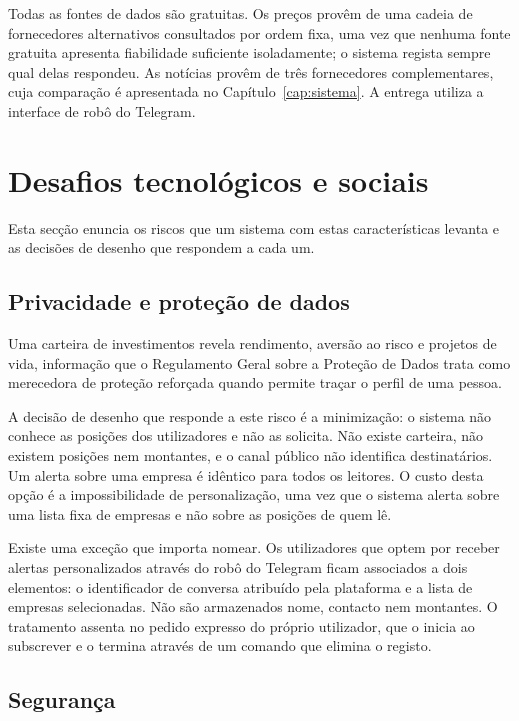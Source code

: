 Todas as fontes de dados são gratuitas. Os preços provêm de uma cadeia de fornecedores alternativos
consultados por ordem fixa, uma vez que nenhuma fonte gratuita apresenta fiabilidade suficiente
isoladamente; o sistema regista sempre qual delas respondeu. As notícias provêm de três fornecedores
complementares, cuja comparação é apresentada no Capítulo~\ref{cap:sistema}. A entrega utiliza a
interface de robô do Telegram.

\section{Desafios tecnológicos e sociais}
\label{sec:met_desafios}

Esta secção enuncia os riscos que um sistema com estas características levanta e as decisões de
desenho que respondem a cada um.

\subsection{Privacidade e proteção de dados}
\label{sec:met_privacidade}

Uma carteira de investimentos revela rendimento, aversão ao risco e projetos de vida, informação
que o Regulamento Geral sobre a Proteção de Dados trata como merecedora de proteção reforçada
quando permite traçar o perfil de uma pessoa.

A decisão de desenho que responde a este risco é a minimização: o sistema não conhece as posições
dos utilizadores e não as solicita. Não existe carteira, não existem posições nem montantes, e o
canal público não identifica destinatários. Um alerta sobre uma empresa é idêntico para todos os
leitores. O custo desta opção é a impossibilidade de personalização, uma vez que o sistema alerta
sobre uma lista fixa de empresas e não sobre as posições de quem lê.

Existe uma exceção que importa nomear. Os utilizadores que optem por receber alertas personalizados
através do robô do Telegram ficam associados a dois elementos: o identificador de conversa
atribuído pela plataforma e a lista de empresas selecionadas. Não são armazenados nome, contacto
nem montantes. O tratamento assenta no pedido expresso do próprio utilizador, que o inicia ao
subscrever e o termina através de um comando que elimina o registo.

\subsection{Segurança}
\label{sec:met_seguranca}

